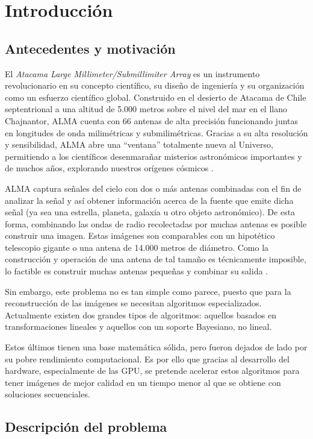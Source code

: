 \chapter{Introducci\'on}
\label{cap:introduccion}

\section{Antecedentes y motivaci\'on}
\label{intro:motivacion}
El \textit{Atacama Large Millimeter/Submillimiter Array} es un instrumento revolucionario en su concepto científico, su diseño de ingeniería y su organización como un esfuerzo científico global. Construido en el desierto de Atacama de Chile septentrional a una altitud de 5.000 metros sobre el nivel del mar en el llano Chajnantor, ALMA cuenta con 66 antenas de alta precisión funcionando juntas en longitudes de onda milimétricas y submilimétricas. Gracias a su alta resolución y sensibilidad, ALMA abre una “ventana” totalmente nueva al Universo, permitiendo a los científicos desenmarañar misterios astronómicos importantes y de muchos años, explorando nuestros orígenes cósmicos \cite{alma}.

ALMA captura señales del cielo con dos o más antenas combinadas con el fin de analizar  la señal y así obtener información acerca de la fuente que emite dicha señal (ya sea una estrella, planeta, galaxia u otro objeto astronómico). De esta forma, combinando las ondas de radio recolectadas por muchas antenas es posible construir una imagen. Estas imágenes son comparables con un hipotético telescopio gigante o una antena de 14.000 metros de diámetro. Como la construcción y operación de una antena de tal tamaño es técnicamente imposible, lo factible es construir muchas antenas pequeñas y combinar su salida \cite{howalma}.

Sin embargo, este problema no es tan simple como parece, puesto que para la reconstrucción de las imágenes se necesitan algoritmos especializados. Actualmente existen dos grandes tipos de algoritmos: aquellos basados en transformaciones lineales y aquellos con un soporte Bayesiano, no lineal.

Estos últimos tienen una base matemática sólida, pero fueron dejados de lado por su pobre rendimiento computacional. Es por ello que gracias al desarrollo del hardware, especialmente de las GPU, se pretende acelerar estos algoritmos para tener imágenes de mejor calidad en un tiempo menor al que se obtiene con soluciones secuenciales.

\section{Descripci\'on del problema}
\label{intro:problema}

